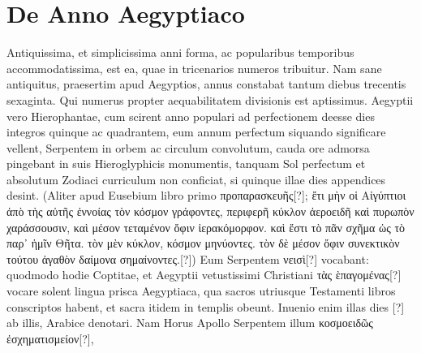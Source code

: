 \section{De Anno Aegyptiaco}
%
Antiquissima, et simplicissima anni forma, ac popularibus
temporibus accommodatissima, est ea, quae in tricenarios
numeros tribuitur.
Nam sane antiquitus, praesertim apud
Aegyptios, annus constabat tantum diebus trecentis sexaginta.
Qui numerus
propter aequabilitatem divisionis est aptissimus.
Aegyptii vero
Hierophantae, cum scirent anno populari ad perfectionem deesse dies
integros quinque ac quadrantem, eum annum perfectum siquando
significare vellent, Serpentem in orbem ac circulum convolutum,
cauda ore admorsa pingebant in suis Hieroglyphicis monumentis,
tanquam Sol perfectum et absolutum Zodiaci curriculum non conficiat,
si quinque illae dies appendices desint.
(Aliter apud Eusebium
libro primo \textgreek{προπαρασκευῆς}[?];
\textgreek{ἔτι μὴν οἱ Αἰγύπτιοι ἀπὸ τὴς αὐτῆς ἐννοίας
τὸν κόσμον γράφοντες, περιφερῆ κύκλον ἀεροειδῆ καὶ πυρωπὸν χαράσσουσιν, καὶ μέσον
τεταμένον ὄφιν ἱερακόμορφον. καὶ ἔστι τὸ πᾶν σχῆμα ὡς τὸ παρ᾽ ἡμῖν Θῆτα.
τὸν μὲν κύκλον, κόσμον μηνύοντες. τὸν δὲ μέσον ὄφιν συνεκτικὸν τούτου ἀγαθὸν
δαίμονα σημαίνοντες.}[?])
Eum Serpentem \textgreek{νεισὶ}[?] vocabant: quodmodo hodie
Coptitae, et Aegyptii vetustissimi Christiani
 \textgreek{τὰς ὲπαγομένας}[?] vocare
solent lingua prisca Aegyptiaca, qua sacros utriusque Testamenti
libros conscriptos habent, et sacra itidem in templis obeunt.
Inuenio enim illas dies \textarabic{}[?] ab illis, Arabice denotari.
Nam Horus
Apollo Serpentem illum \textgreek{κοσμοειδῶς ἐσχηματισμείον}[?],
